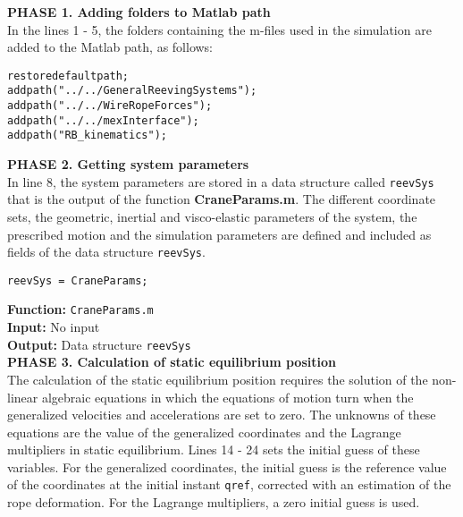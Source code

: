 \textbf{PHASE 1. Adding folders to Matlab path} \\

In the lines 1 - 5, the folders containing the m-files used in the simulation are added to the Matlab path, as follows:

\begin{tcolorbox}{\begin{lstlisting}[style=Matlab-editor]
restoredefaultpath;
addpath("../../GeneralReevingSystems");
addpath("../../WireRopeForces");
addpath("../../mexInterface");
addpath("RB_kinematics");
\end{lstlisting}}
\end{tcolorbox} 

\textbf{PHASE 2. Getting system parameters} \\

In line 8, the system parameters are stored in a data structure called \texttt{reevSys} that is the output of the function \textbf{CraneParams.m}. The different coordinate sets, the geometric, inertial and visco-elastic parameters of the system, the prescribed motion and the simulation parameters are defined and included as fields of the data structure \texttt{reevSys}. 

\begin{tcolorbox}{\begin{lstlisting}[style=Matlab-editor]
% Getting system parameters %
reevSys = CraneParams;
\end{lstlisting}}
\end{tcolorbox}

\setlength{\parindent}{0cm}
\textbf{Function:} \texttt{CraneParams.m} \\
\textbf{Input:} No input \\
\textbf{Output:} Data structure \texttt{reevSys} \\

\textbf{PHASE 3. Calculation of static equilibrium position} \\

The calculation of the static equilibrium position requires the solution of the non-linear algebraic equations in which the equations of motion turn when the generalized velocities and accelerations are set to zero. The unknowns of these equations are the value of the generalized coordinates and the Lagrange multipliers in static equilibrium. Lines 14 - 24 sets the initial guess of these variables. For the generalized coordinates, the initial guess is the reference value of the coordinates at the initial instant \texttt{qref}, corrected with an estimation of the rope deformation. For the Lagrange multipliers, a zero initial guess is used.

